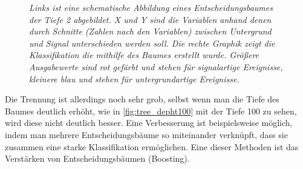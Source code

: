 \begin{figure}[hhh]
\centering     %
{}
\caption{\it Links ist eine schematische Abbildung eines Entscheidungsbaumes der Tiefe 2 abgebildet. X und Y sind die Variablen anhand denen durch Schnitte (Zahlen nach den Variablen) zwischen Untergrund und Signal unterschieden werden soll. Die rechte Graphik zeigt die Klassifikation die mithilfe des Baumes erstellt wurde. Gr\"o\ss ere Ausgabewerte sind rot gef\"arbt und stehen f\"ur signalartige Ereignisse, kleinere blau und stehen f\"ur untergrundartige Ereignisse.}
\end{figure}

Die Trennung ist allerdings noch sehr grob, selbst wenn man die Tiefe des Baumes deutlich erh\"oht, wie in \ref{fig:tree_depht100} mit der Tiefe 100 zu sehen, wird diese nicht deutlich besser. Eine Verbesserung ist beispielsweise m\"oglich, indem man mehrere Entscheidungsb\"aume so miteinander verkn\"upft, dass sie zusammen eine starke Klassifikation erm\"oglichen. Eine dieser Methoden ist das Verst\"arken von Entscheidungsb\"aumen (Boosting).





